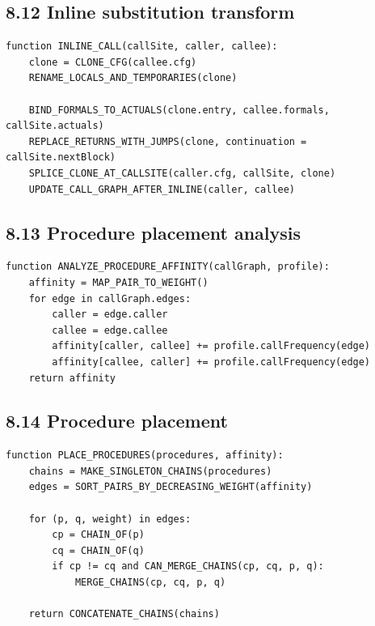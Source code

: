 \documentclass[10pt,letterpaper]{article}
\begin{document}
\subsection*{8.12 Inline substitution transform}

\begin{verbatim}
function INLINE_CALL(callSite, caller, callee):
    clone = CLONE_CFG(callee.cfg)
    RENAME_LOCALS_AND_TEMPORARIES(clone)

    BIND_FORMALS_TO_ACTUALS(clone.entry, callee.formals, callSite.actuals)
    REPLACE_RETURNS_WITH_JUMPS(clone, continuation = callSite.nextBlock)
    SPLICE_CLONE_AT_CALLSITE(caller.cfg, callSite, clone)
    UPDATE_CALL_GRAPH_AFTER_INLINE(caller, callee)
\end{verbatim}

\subsection*{8.13 Procedure placement analysis}

\begin{verbatim}
function ANALYZE_PROCEDURE_AFFINITY(callGraph, profile):
    affinity = MAP_PAIR_TO_WEIGHT()
    for edge in callGraph.edges:
        caller = edge.caller
        callee = edge.callee
        affinity[caller, callee] += profile.callFrequency(edge)
        affinity[callee, caller] += profile.callFrequency(edge)
    return affinity
\end{verbatim}

\subsection*{8.14 Procedure placement}

\begin{verbatim}
function PLACE_PROCEDURES(procedures, affinity):
    chains = MAKE_SINGLETON_CHAINS(procedures)
    edges = SORT_PAIRS_BY_DECREASING_WEIGHT(affinity)

    for (p, q, weight) in edges:
        cp = CHAIN_OF(p)
        cq = CHAIN_OF(q)
        if cp != cq and CAN_MERGE_CHAINS(cp, cq, p, q):
            MERGE_CHAINS(cp, cq, p, q)

    return CONCATENATE_CHAINS(chains)
\end{verbatim}
\end{document}
